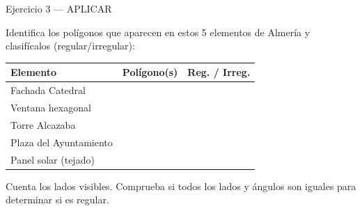 \documentclass[aspectratio=169, 10pt, spanish]{beamer}
\begin{document}
\begin{frame}{Ejercicio 3 — APLICAR }
  \begin{aplicarbox}
    Identifica los polígonos que aparecen en estos 5 elementos
    de Almería y clasifícalos (regular/irregular):

    \vspace{0.15cm}
    \AlmFontSmall
    \begin{tabular}{@{}p{3.2cm}p{3.5cm}p{2.8cm}@{}}
      \toprule
      \textbf{Elemento} & \textbf{Polígono(s)} & \textbf{Reg. / Irreg.} \\
      \midrule
      Fachada Catedral & \phantom{xxxxxxxxxx} & \phantom{xxxxx} \\
      Ventana hexagonal & \phantom{xxxxxxxxxx} & \phantom{xxxxx} \\
      Torre Alcazaba & \phantom{xxxxxxxxxx} & \phantom{xxxxx} \\
      Plaza del Ayuntamiento & \phantom{xxxxxxxxxx} & \phantom{xxxxx} \\
      Panel solar (tejado) & \phantom{xxxxxxxxxx} & \phantom{xxxxx} \\
      \bottomrule
    \end{tabular}
  \end{aplicarbox}
  \vspace{0.15cm}
  \begin{notabox}[Recuerda]
    \AlmFontSmall Cuenta los lados visibles. Comprueba si todos los lados
    y ángulos son iguales para determinar si es regular.
  \end{notabox}
\end{frame}

\end{document}

